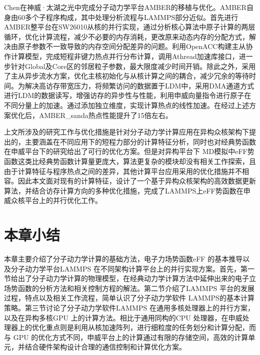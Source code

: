 Chen在神威·太湖之光中完成分子动力学平台AMBER的移植与优化。AMBER自身由60多个子程序构成，其中处理分析流程与LAMMPS部分近似。首先进行AMBER整平台在SW26010从核的并行实现，通过分析核心算法中原子计算的两层循环，优化计算流程，减少不必要的内存消耗，更改原来动态内存的分配方式，解决由原子参数不一致导致的内存空间分配差异的问题。利用OpenACC构建主从协作计算模型，完成短程非键力热点并行分布计算，调用Athread加速库接口，进一步针对Global及Core区的邻居粒子参数，最大限度减少时间开销。除此之外，采用了主从异步流水方案，优化主核初始化与从核计算之间的耦合，减少冗余的等待时间。为解决高访存带宽压力，将频繁访问的数据置于LDM中，采用DMA通道方式进行LDM的数据读写，增强访存的异步性与性能，利用申威向量指令进行原子在不同分量上的加速。通过添加独立维度，实现计算热点的线性加速。在经过上述方案优化后，AMBER\_sanda热点性能提升了15倍左右。

上文所涉及的研究工作与优化措施是针对分子动力学计算应用在异构众核架构下提出的，主要涵盖在不同应用下的短程力部分的计算特征分析，同时也对经典势函数在申威平台下的研究给出了可行的优化方案。但是对异构平台下 MD模拟中eFF势函数这类比经典势函数计算量更庞大，算法更复杂的模块却没有相关工作探索，且由于计算特征与程序热点之间的差异，其他计算平台应用采用的优化措施并不相容。因此本文面对现有的计算特征，设计了一个基于异构众核架构的高效数据更新算法，并结合访存计算方向的多种优化措施，完成了LAMMPS上eFF势函数在申威众核平台上的并行优化工作。

\section{本章小结}
本章主要介绍了分子动力学计算的基础方法，电子力场势函数eFF 的基本推导以及分子动力学平台LAMMPS 在不同架构计算平台上的并行实现方案。首先，第一节给出了分子动力学计算的物理模型，在经典动力学计算方法中延伸出来的电子立场势函数的分析方法和相关控制方程的解法。第二节介绍了LAMMPS 平台的发展过程，特点以及相关工作流程，简单认识了分子动力学软件 LAMMPS的基本计算策略。第三节讨论了分子动力学软件LAMMPS 在通用多核处理器上的并行方案，以及在异构多核GPU 上的计算方法。相比于通用同构的CPU 处理器，在申威处理器上的优化重点则是利用从核加速阵列，进行细粒度的任务划分和计算分配，而与 GPU 的优化方式不同，申威平台上的计算通过有限的存储空间，高效的计算单元，并结合硬件架构设计合理的通信控制和计算优化方案。

